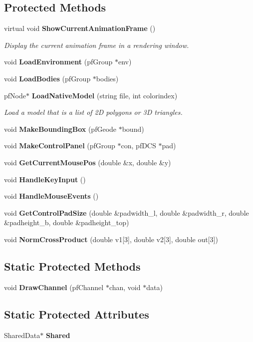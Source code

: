 \subsection*{Protected Methods}
\begin{CompactItemize}
\item 
virtual void {\bf Show\-Current\-Animation\-Frame} ()
\begin{CompactList}\small\item\em Display the current animation frame in a rendering window.\item\end{CompactList}\item 
void {\bf Load\-Environment} (pf\-Group $\ast$env)
\item 
void {\bf Load\-Bodies} (pf\-Group $\ast$bodies)
\item 
pf\-Node$\ast$ {\bf Load\-Native\-Model} (string file, int colorindex)
\begin{CompactList}\small\item\em Load a model that is a list of 2D polygons or 3D triangles.\item\end{CompactList}\item 
void {\bf Make\-Bounding\-Box} (pf\-Geode $\ast$bound)
\item 
void {\bf Make\-Control\-Panel} (pf\-Group $\ast$con, pf\-DCS $\ast$pad)
\item 
void {\bf Get\-Current\-Mouse\-Pos} (double \&x, double \&y)
\item 
void {\bf Handle\-Key\-Input} ()
\item 
void {\bf Handle\-Mouse\-Events} ()
\item 
void {\bf Get\-Control\-Pad\-Size} (double \&padwidth\_\-l, double \&padwidth\_\-r, double \&padheight\_\-b, double \&padheight\_\-top)
\item 
void {\bf Norm\-Cross\-Product} (double v1[3], double v2[3], double out[3])
\end{CompactItemize}
\subsection*{Static Protected Methods}
\begin{CompactItemize}
\item 
void {\bf Draw\-Channel} (pf\-Channel $\ast$chan, void $\ast$data)
\end{CompactItemize}
\subsection*{Static Protected Attributes}
\begin{CompactItemize}
\item 
Shared\-Data$\ast$ {\bf Shared}
\end{CompactItemize}


